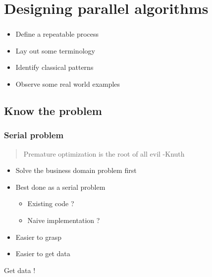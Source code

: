 \section{Designing parallel algorithms}
\label{sec:parallel_algos}

\begin{frame}
  \frametitle{}

  \begin{itemize}
  \item Define a repeatable process
  \item Lay out some terminology
  \item Identify classical patterns
  \item Observe some real world examples
  \end{itemize}
\end{frame}

\subsection{Know the problem}
\label{subsec:parallel_problem}

\begin{frame}
  \frametitle{Serial problem}
  \begin{quotation}
    Premature optimization is the root of all evil
    -Knuth
  \end{quotation}
  \begin{itemize}
  \item Solve the business domain problem first
  \item Best done as a serial problem
    \begin{itemize}
    \item Existing code ?
    \item Naive implementation ?
    \end{itemize}
  \item Easier to grasp
  \item Easier to get data

  \end{itemize}
\end{frame}

\begingroup
\huge
\begin{frame}
  Get data !
\end{frame}
\endgroup

